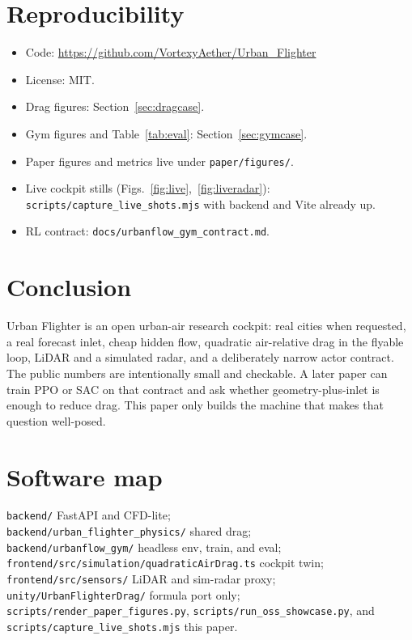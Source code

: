 \documentclass[11pt]{article}
\begin{document}
\section{Reproducibility}

\begin{itemize}
  \item Code: \url{https://github.com/VortexyAether/Urban_Flighter}
  \item License: MIT.
  \item Drag figures: Section~\ref{sec:dragcase}.
  \item Gym figures and Table~\ref{tab:eval}: Section~\ref{sec:gymcase}.
  \item Paper figures and metrics live under \texttt{paper/figures/}.
  \item Live cockpit stills (Figs.~\ref{fig:live},~\ref{fig:liveradar}):
        \texttt{scripts/capture\_live\_shots.mjs} with backend and Vite already up.
  \item RL contract: \texttt{docs/urbanflow\_gym\_contract.md}.
\end{itemize}

\section{Conclusion}

Urban Flighter is an open urban-air research cockpit: real cities when requested, a real forecast inlet, cheap hidden flow, quadratic air-relative drag in the flyable loop, LiDAR and a simulated radar, and a deliberately narrow actor contract.
The public numbers are intentionally small and checkable.
A later paper can train PPO or SAC on that contract and ask whether geometry-plus-inlet is enough to reduce drag.
This paper only builds the machine that makes that question well-posed.




\appendix
\section{Software map}
{\raggedright
\texttt{backend/} FastAPI and CFD-lite;\\
\texttt{backend/urban\_flighter\_physics/} shared drag;\\
\texttt{backend/urbanflow\_gym/} headless env, train, and eval;\\
\texttt{frontend/src/simulation/quadraticAirDrag.ts} cockpit twin;\\
\texttt{frontend/src/sensors/} LiDAR and sim-radar proxy;\\
\texttt{unity/UrbanFlighterDrag/} formula port only;\\
\texttt{scripts/render\_paper\_figures.py}, \texttt{scripts/run\_oss\_showcase.py}, and \texttt{scripts/capture\_live\_shots.mjs} this paper.
\par}
\end{document}
